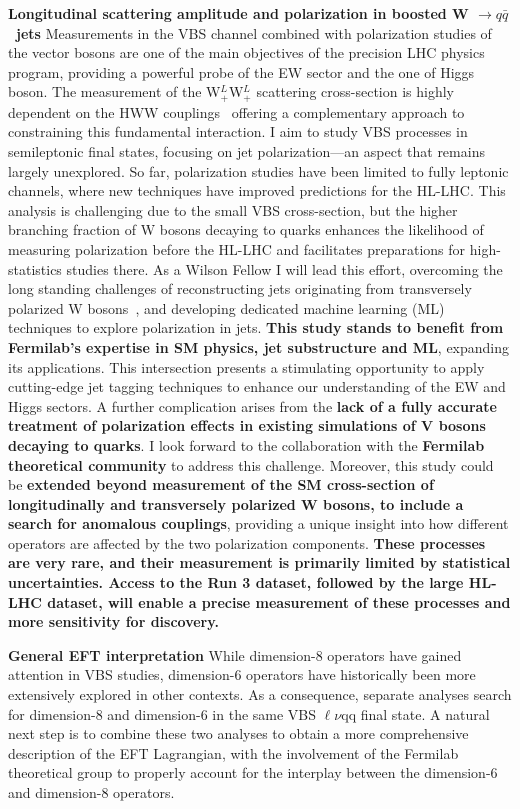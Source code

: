 {\begin{flushleft}
\textbf{Longitudinal scattering amplitude and polarization in boosted W $\to q\bar{q}$ \ jets}
Measurements in the VBS channel combined with polarization studies of the vector bosons are one of the main objectives of the precision LHC physics program, providing a powerful probe of the EW sector and the one of Higgs boson.
The measurement of the  W$^L_+$W$^L_+$ scattering cross-section is highly dependent on the HWW couplings~\cite{[4]} offering a complementary approach to constraining this fundamental interaction.
I aim to study VBS processes in semileptonic final states, focusing on jet polarization—an aspect that remains largely unexplored. So far, polarization studies have been limited to fully leptonic channels, where new techniques have improved predictions for the HL-LHC. This analysis is challenging due to the small VBS cross-section, but the higher branching fraction of W bosons decaying to quarks enhances the likelihood of measuring polarization before the HL-LHC and facilitates preparations for high-statistics studies there. As a Wilson Fellow I will lead this effort, overcoming the long standing challenges of reconstructing jets originating from transversely polarized W bosons~\cite{[5]}, and developing dedicated machine learning (ML) techniques to explore polarization in jets.
\textbf{This study stands to benefit from Fermilab’s expertise in SM physics, jet substructure and ML}, expanding its applications. This intersection presents a stimulating opportunity to apply cutting-edge jet tagging techniques to enhance our understanding of the EW and Higgs sectors.
A further complication arises from the {\bf lack of a fully accurate treatment of polarization effects in existing simulations of V bosons decaying to quarks}. I look forward to the collaboration with the {\bf Fermilab theoretical community} to address this challenge.  
Moreover, this study could be {\bf extended beyond measurement of the SM cross-section of longitudinally and transversely polarized W bosons, to include a search for anomalous couplings}, providing a unique insight into how different operators are affected by the two polarization components.
{\bf These processes are very rare, and their measurement is primarily limited by statistical uncertainties. Access to the Run 3 dataset, followed by the large HL-LHC dataset, will enable a precise measurement of these processes and more sensitivity for discovery.}

\textbf{General EFT interpretation}
While dimension-8 operators have gained attention in VBS studies, dimension-6 operators have historically been more extensively explored in other contexts. As a consequence, separate analyses search for dimension-8 and dimension-6 in the same VBS $\ell\nu$qq final state. A natural next step is to combine these two analyses to obtain a more comprehensive description of the EFT Lagrangian, with the involvement of the Fermilab theoretical group to properly account for the interplay between the dimension-6 and dimension-8 operators.


\end{flushleft}}

